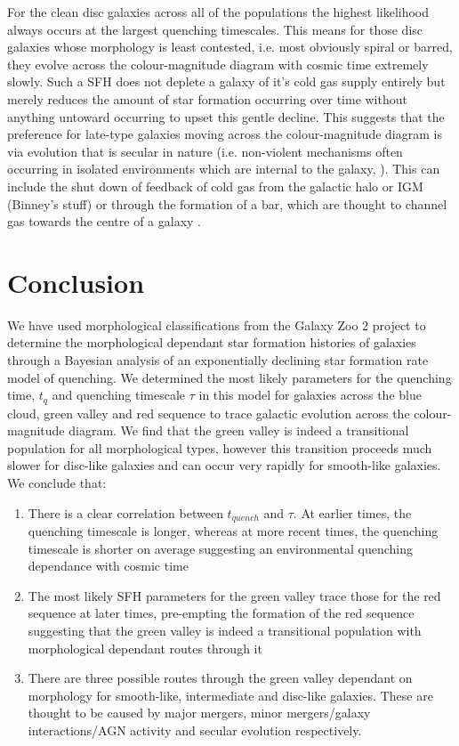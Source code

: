 \documentclass{mn2e}
\begin{document}
For the clean disc galaxies across all of the populations the highest likelihood always occurs at the largest quenching timescales. This means for those disc galaxies whose morphology is least contested, i.e. most obviously spiral or barred, they evolve across the colour-magnitude diagram with cosmic time extremely slowly. Such a SFH does not deplete a galaxy of it's cold gas supply entirely but merely reduces the amount of star formation occurring over time without anything untoward occurring to upset this gentle decline. This suggests that the preference for late-type galaxies moving across the colour-magnitude diagram is via evolution that is secular in nature (i.e. non-violent mechanisms often occurring in isolated environments which are internal to the galaxy, \citealt{KK04, Sheth12}). This can include the shut down of feedback of cold gas from the galactic halo or IGM (Binney's stuff) or through the formation of a bar, which are thought to channel gas towards the centre of a galaxy \citep{Masters10, Cheung13, Melvin14}.


\section{Conclusion}\label{conc}
We have used morphological classifications from the Galaxy Zoo 2 project to determine the morphological dependant star formation histories of galaxies through a Bayesian analysis of an exponentially declining star formation rate model of quenching. We determined the most likely parameters for the quenching time, $t_q$ and quenching timescale $\tau$ in this model for galaxies across the blue cloud, green valley and red sequence to trace galactic evolution across the colour-magnitude diagram. We find that the green valley is indeed a transitional population for all morphological types, however this transition proceeds much slower for disc-like galaxies and can occur very rapidly for smooth-like galaxies. We conclude that:
\begin{enumerate}
\item There is a clear correlation between $t_{quench}$ and $\tau$. At earlier times, the quenching timescale is longer, whereas at more recent times, the quenching timescale is shorter on average suggesting an environmental quenching dependance with cosmic time
\item The most likely SFH parameters for the green valley trace those for the red sequence at later times, pre-empting the formation of the red sequence suggesting that the green valley is indeed a transitional population with morphological dependant routes through it
\item There are three possible routes through the green valley dependant on morphology for smooth-like, intermediate and disc-like galaxies. These are thought to be caused by major mergers, minor mergers/galaxy interactions/AGN activity and secular evolution respectively.
\end{enumerate}
\end{document}
